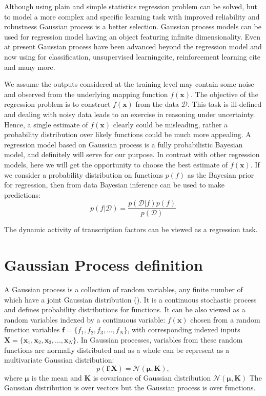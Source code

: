 Although using plain and simple statistics regression
problem can be solved, but to model a more complex and specific learning task with improved
reliability and robustness Gaussian process is a better selection. 
Gaussian process models can be used for regression model having an object featuring 
infinite dimensionality. Even at present Gaussian process have been
advanced beyond the regression model and now using for classification, 
unsupervised learningcite{}, reinforcement learning cite{} and many more. %

We assume the outputs considered at the training level may contain some noise and observed
from the underlying mapping function $f(\textbf{x})$. The objective of the regression problem
is to construct $f(\textbf{x})$ from the data $\mathcal{D}$. This task is ill-defined and 
dealing with noisy data leads to an exercise in reasoning under uncertainty. Hence, a single 
estimate of $f(\textbf{x})$ clearly could be misleading, rather a probability distribution over
likely functions could be much more appealing. A regression model based on Gaussian process 
is a fully probabilistic Bayesian model, and definitely will serve for our purpose. In contrast with
other regression models, here we will get the opportunity to choose the best estimate of 
$f(\textbf{x})$. If we consider a probability distribution on functions $p(f)$ as the Bayesian
prior for regression, then from data Bayesian inference can be used to make predictions:
\begin{equation} \label{eq:2.1}
p(f|\mathcal{D})= \frac{p(\mathcal{D}|f)p(f)}{p(\mathcal{D})} 
\end{equation}


The dynamic activity of transcription factors can be viewed as a regression task.

\section{Gaussian Process definition}
A Gaussian process is a collection of random variables, any finite number of which have a 
joint Gaussian distribution (\cite{Rasmussen_and_Williams:2006}). It is a continuous
stochastic process and defines probability distributions for functions. It can be also viewed
as a random variables indexed by a continuous variable: $ f(\textbf{x})$ chosen from a random
function variables $ \textbf{f} = \{ f_1, f_2, f_3,..., f_N\}$, with corresponding indexed inputs
$ \textbf{X} = \{ \textbf{x}_1, \textbf{x}_2, \textbf{x}_3,..., \textbf{x}_N\}$. In Gaussian processes,
variables from these random functions are normally distributed and as a whole can be represent as a
multivariate Gaussian distribution:
\begin{equation} \label{eq:2.2}
p(\textbf{f}|\textbf{X})= \mathcal{N}(\boldsymbol\mu,\textbf{K}),
\end{equation}
where $\boldsymbol\mu$ is the mean and $\textbf{K}$ is covariance of Gaussian distribution
$\mathcal{N}(\boldsymbol\mu,\textbf{K})$
The Gaussian distribution is over vectors but the Gaussian process is over functions.

